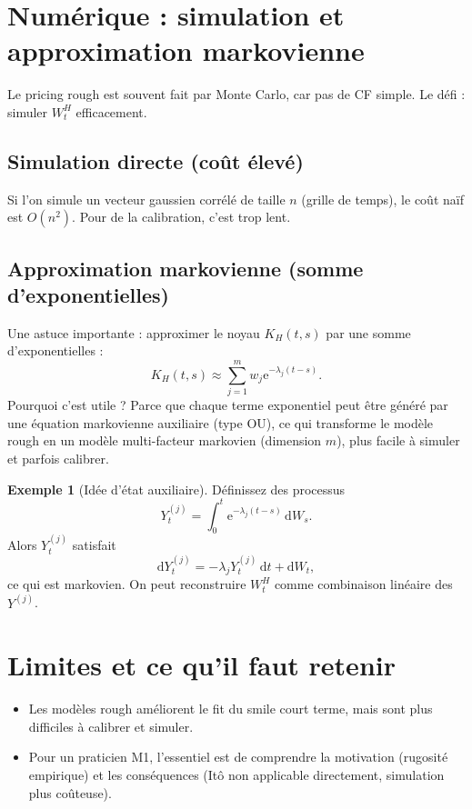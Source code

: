 \documentclass[11pt,a4paper]{report}
\newcommand{\dd}{\mathrm{d}}
\newcommand{\ee}{\mathrm{e}}
\newcommand{\1}{\mathbbm{1}}
\theoremstyle{definition}
\newtheorem{example}{Exemple}[chapter]
\theoremstyle{plain}
\theoremstyle{remark}
\begin{document}
\section{Numérique : simulation et approximation markovienne}
\label{sec:rough_numerics}

Le pricing rough est souvent fait par Monte Carlo, car pas de CF simple.
Le défi : simuler $W_t^H$ efficacement.

\subsection{Simulation directe (coût élevé)}
Si l'on simule un vecteur gaussien corrélé de taille $n$ (grille de temps), le coût naïf est $O(n^2)$.
Pour de la calibration, c'est trop lent.

\subsection{Approximation markovienne (somme d'exponentielles)}
Une astuce importante :
approximer le noyau $K_H(t,s)$ par une somme d'exponentielles :
\[
K_H(t,s)\approx \sum_{j=1}^m w_j \ee^{-\lambda_j(t-s)}.
\]
Pourquoi c'est utile ?
Parce que chaque terme exponentiel peut être généré par une équation markovienne auxiliaire (type OU),
ce qui transforme le modèle rough en un modèle multi-facteur markovien (dimension $m$), plus facile à simuler et parfois calibrer.

\begin{example}[Idée d'état auxiliaire]
Définissez des processus
\[
Y_t^{(j)} = \int_0^t \ee^{-\lambda_j(t-s)}\,\dd W_s.
\]
Alors $Y_t^{(j)}$ satisfait
\[
\dd Y_t^{(j)} = -\lambda_j Y_t^{(j)}\,\dd t + \dd W_t,
\]
ce qui est markovien.
On peut reconstruire $W_t^H$ comme combinaison linéaire des $Y^{(j)}$.
\end{example}

\section{Limites et ce qu'il faut retenir}
\begin{itemize}
  \item Les modèles rough améliorent le fit du smile court terme, mais sont plus difficiles à calibrer et simuler.
  \item Pour un praticien M1, l'essentiel est de comprendre la motivation (rugosité empirique) et les conséquences (Itô non applicable directement, simulation plus coûteuse).
\end{itemize}
\end{document}
